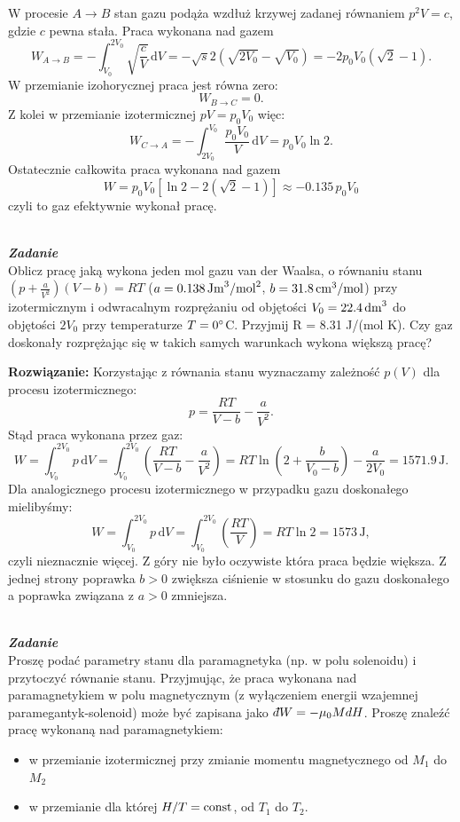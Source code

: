\documentclass[11pt,a4paper]{article}
\newcounter{zadanie}\newcommand{\zadanie}[1][]{\addtocounter{zadanie}{1} ~\\  {\bf \emph{Zadanie \arabic{zadanie} #1 }} \\}
\newcommand{\dbar}{{\mkern3mu\mathchar'26\mkern-12mu d}}
\renewcommand{\t}[1]{\textrm{#1}}
\begin{document}
W procesie $A\rightarrow B$ stan gazu podąża wzdłuż krzywej zadanej równaniem $p^2 V = c$, gdzie $c$ pewna stała.
Praca wykonana nad gazem
$$
W_{A\rightarrow B} = -\int_{V_0}^{2 V_0} \sqrt{\frac{c}{V}}\,\t{d}V = -\sqrt{s} 2\left( \sqrt{2 V_0} - \sqrt{V_0}\right) = -2 p_0 V_0(\sqrt{2}-1).
$$
W przemianie izohorycznej praca jest równa zero:
$$
W_{B \rightarrow C} = 0.
$$
Z kolei w przemianie izotermicznej $p V = p_0 V_0$ więc:
$$
W_{C\rightarrow A} = - \int_{2V_0}^{V_0} \frac{p_0 V_0}{V}\, \t{d} V  = p_0 V_0 \ln 2.
$$
Ostatecznie całkowita praca wykonana nad gazem
 $$W = p_0 V_0 [\ln 2 -2(\sqrt{2}-1)] \approx -0.135 \,p_0V_0$$
 czyli to gaz efektywnie wykonał pracę.
\newpage
\zadanie
Oblicz pracę jaką wykona jeden mol gazu van der Waalsa, o równaniu stanu
$(p+\frac{a}{V^2})(V-b)=RT$
($a=0.138\,\rm{Jm}^3/\rm{mol}^2$, $b=31.8\,\rm{cm^3/mol}$)
przy izotermicznym i odwracalnym rozprężaniu od objętości $V_0=22.4\,\rm{dm}^3$
do objętości $2 V_0$ przy temperaturze $T=0\degree$C.
Przyjmij R = 8.31 J/(mol K).
Czy gaz doskonały rozprężając się w takich samych warunkach wykona większą pracę?

\vskip 10pt
\textbf{Rozwiązanie:}
Korzystając z równania stanu wyznaczamy zależność $p(V)$ dla procesu izotermicznego:
$$
p = \frac{R T}{V-b} - \frac{a}{V^2}.
$$
Stąd praca wykonana przez gaz:
$$
W = \int_{V_0}^{2 V_0} p \,\t{d}V = 
\int_{V_0}^{2V_0}\left(\frac{R T}{V-b} - \frac{a}{V^2}\right) = 
R T \ln \left(2 + \frac{b}{V_0 - b}\right) - \frac{a}{2V_0} = 1571.9\, \t{J}.
$$
Dla analogicznego procesu izotermicznego w przypadku gazu doskonałego mielibyśmy:
$$
W = \int_{V_0}^{2 V_0} p \,\t{d}V = 
\int_{V_0}^{2V_0}\left(\frac{R T}{V}\right) =  
RT \ln 2 =  1573\, \t{J},
$$
czyli nieznacznie więcej. Z góry nie było oczywiste która praca będzie większa. Z jednej strony poprawka $b>0$ zwiększa ciśnienie w stosunku do gazu doskonałego a poprawka związana z $a>0$ zmniejsza.
\newpage
\zadanie
Proszę podać parametry stanu dla   paramagnetyka (np. w polu solenoidu)
i przytoczyć równanie stanu. Przyjmując, że praca wykonana 
nad paramagnetykiem w polu magnetycznym
(z wyłączeniem energii wzajemnej paramegantyk-solenoid) może być zapisana jako
 $\dbar W = -\mu_0 M dH$.
Proszę znaleźć pracę wykonaną nad paramagnetykiem:
\begin{itemize}
\item w przemianie izotermicznej przy zmianie momentu magnetycznego od $M_1$ do $M_2$
\item w przemianie dla której $H/T={\rm const}$, od $T_1$ do $T_2$. 
\end{itemize}
\end{document}
